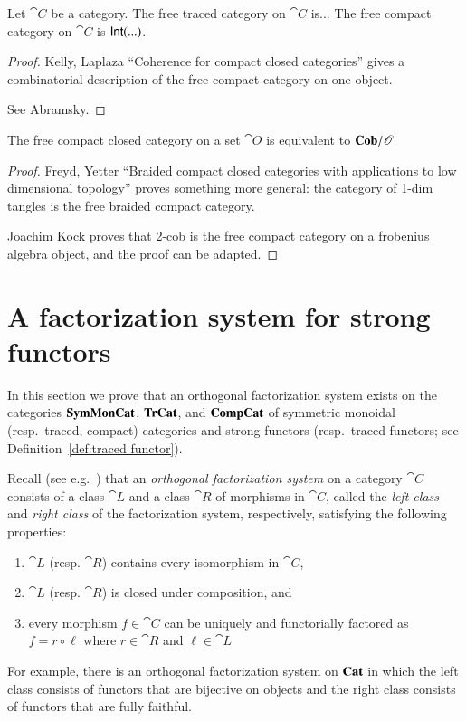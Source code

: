 \documentclass[12pt,oneside,article,draft]{memoir}
\begin{document}
\begin{enumerate}
\begin{proposition}\label{prop:free traced and compact}
	Let $\cat{C}$ be a category.
	The free traced category on $\cat{C}$ is...
	The free compact category on $\cat{C}$ is $\mathsf{Int}(...)$.
\end{proposition}
\begin{proof}
	Kelly, Laplaza ``Coherence for compact closed categories'' gives a combinatorial description of the free compact category on one object. 

	See Abramsky. 
\end{proof}

\begin{proposition}\label{prop:free compact is Cob}
	The free compact closed category on a set $\cat{O}$ is equivalent to $\mathbf{Cob}/\mathscr{O}$
\end{proposition}
\begin{proof}
	Freyd, Yetter ``Braided compact closed categories with applications to low dimensional topology'' proves something more general: the category of 1-dim tangles is the free braided compact category. 

	Joachim Kock proves that 2-cob is the free compact category on a frobenius algebra object, and the proof can be adapted.
\end{proof}

\section{A factorization system for strong functors}\label{sec:factorization system}

In this section we prove that an orthogonal factorization system exists on the categories $\mathbf{SymMonCat}$, $\mathbf{TrCat}$, and $\mathbf{CompCat}$ of symmetric monoidal (resp.\ traced, compact) categories and strong functors (resp.\ traced functors; see Definition~\ref{def:traced functor}). 

Recall (see e.g.~\cite{AdamekHerrlichStrecker}) that an \emph{orthogonal factorization system} on a category $\cat{C}$ consists of a class $\cat{L}$ and a class $\cat{R}$ of morphisms in $\cat{C}$, called the \emph{left class} and \emph{right class} of the factorization system, respectively, satisfying the following properties:
\begin{enumerate}
	\item $\cat{L}$ (resp. $\cat{R}$) contains every isomorphism in $\cat{C}$, 
	\item $\cat{L}$ (resp. $\cat{R}$) is closed under composition, and
	\item every morphism $f\in\cat{C}$ can be uniquely and functorially factored as $f=r\circ\ell$ where $r\in\cat{R}$ and $\ell\in\cat{L}$
\end{enumerate}
For example, there is an orthogonal factorization system on $\mathbf{Cat}$ in which the left class consists of functors that are bijective on objects and the right class consists of functors that are fully faithful. 


\end{enumerate}
\end{document}
